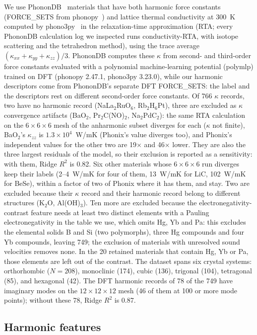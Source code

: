 \documentclass[aps,prm,reprint,onecolumn,groupedaddress]{revtex4-2}
\begin{document}
We use PhononDB~\cite{phonondb} materials that have both harmonic force constants (FORCE\_SETS from phonopy~\cite{togo2015scr}) and lattice thermal conductivity at 300~K computed by phono3py~\cite{togo2015} in the relaxation-time approximation (RTA; every PhononDB calculation log we inspected runs conductivity-RTA, with isotope scattering and the tetrahedron method), using the trace average $(\kappa_{xx}+\kappa_{yy}+\kappa_{zz})/3$. PhononDB computes these $\kappa$ from second- and third-order force constants evaluated with a polynomial machine-learning potential (polymlp) trained on DFT (phonopy 2.47.1, phono3py 3.23.0), while our harmonic descriptors come from PhononDB's separate DFT FORCE\_SETS: the label and the descriptors rest on different second-order force constants. Of 766 $\kappa$ records, two have no harmonic record (NaLa$_2$RuO$_6$, Rb$_2$H$_6$Pt), three are excluded as $\kappa$ convergence artifacts (BaO$_2$, Pr$_2$C(NO)$_2$, Na$_2$PdC$_2$): the same RTA calculation on the $6\times6\times6$ mesh of the anharmonic subset diverges for each ($\kappa$ not finite), BaO$_2$'s $\kappa_{zz}$ is $1.3\times10^{4}$~W/mK (Phonix's value diverges too), and Phonix's independent values for the other two are 19$\times$ and 46$\times$ lower. They are also the three largest residuals of the model, so their exclusion is reported as a sensitivity: with them, Ridge $R^2$ is 0.82. Six other materials whose $6\times6\times6$ run diverges keep their labels (2--4~W/mK for four of them, 13~W/mK for LiC, 102~W/mK for BeSe), within a factor of two of Phonix where it has them, and stay. Two are excluded because their $\kappa$ record and their harmonic record belong to different structures (K$_2$O, Al(OH)$_3$). Ten more are excluded because the electronegativity-contrast feature needs at least two distinct elements with a Pauling electronegativity in the table we use, which omits Hg, Yb and Pa: this excludes the elemental solids B and Si (two polymorphs), three Hg compounds and four Yb compounds, leaving 749; the exclusion of materials with unresolved sound velocities removes none. In the 20 retained materials that contain Hg, Yb or Pa, those elements are left out of the contrast. The dataset spans six crystal systems: orthorhombic ($N = 208$), monoclinic (174), cubic (136), trigonal (104), tetragonal (85), and hexagonal (42). The DFT harmonic records of 78 of the 749 have imaginary modes on the $12\times12\times12$ mesh (46 of them at 100 or more mode points); without these 78, Ridge $R^2$ is 0.87.

\subsection{Harmonic features}
\end{document}
